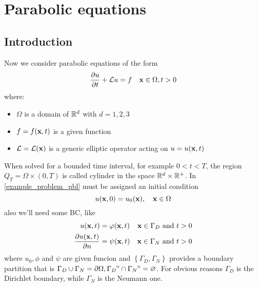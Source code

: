 \newpage
\section{Parabolic equations}
\subsection{Introduction}
Now we consider parabolic equations of the form
\begin{equation}
    \partialderivative{u}{t} + \loperator u = f \quad \vect{x} \in \Omega, t>0
    \label{example_problem_pbl}
\end{equation}
where: 
\begin{itemize}
    \item \(\Omega\) is a domain of \(\mathbb{R}^d\) with \(d = 1,2,3\)
    \item \(f = f(\textbf{x}, t)\) is a given function 
    \item \(\mathcal{L} = \mathcal{L} (\textbf{x})\) is a generic elliptic operator acting on \(u = u(\textbf{x}, t)\)
\end{itemize}
When solved for a bounded time interval, for example \(0 < t < T\), the region \(Q_T = \Omega \times (0,T)\) is called cylinder in the space \(\mathbb{R}^d \times \mathbb{R}^+\). 
In \eqref{example_problem_pbl} must be assigned an initial condition 
\begin{equation}
    u(\textbf{x}, 0) = u_0(\textbf{x}),\quad \textbf{x} \in \Omega
    \label{initial_cond_pbl}
\end{equation}
also we'll need some BC, like 
\begin{equation}
    \begin{aligned}
        u(\xvec, t) &= \phi(\xvec, t) & \xvec \in \Gamma_D \txt{ and } t > 0 \\
        \partialderivative{u(\xvec, t)}{n} &=\psi(\xvec, t) & \xvec \in \Gamma_N \txt{ and } t > 0 
    \end{aligned}
    \label{BC_example_pbl}
\end{equation}
where \(u_0, \phi\) and \(\psi\) are given funcion and \(\left\{ \Gamma_D, \Gamma_N \right\}\) provides a boundary partition that is \(\Gamma_D \cup \Gamma_N = \partial\Omega, {\kern0pt\Gamma_D}^{\mathrm{o}} \cap {\kern0pt\Gamma_N}^{\mathrm{o}} = \varnothing\). For obvious reasons \(\Gamma_D\) is the Dirichlet boundary, while \(\Gamma_N\) is the Neumann one.

